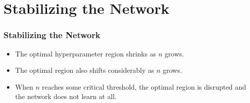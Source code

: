 \section{Stabilizing the Network}


\begin{frame}
\frametitle{Stabilizing the Network}

\begin{itemize}
    \item The optimal hyperparameter region shrinks as \(n\) grows.
    \item The optimal region also shifts considerably as \(n\) grows.
    \item When \(n\) reaches some critical threshold, the optimal region is disrupted and the network does not learn at all.
\end{itemize}

\end{frame}

